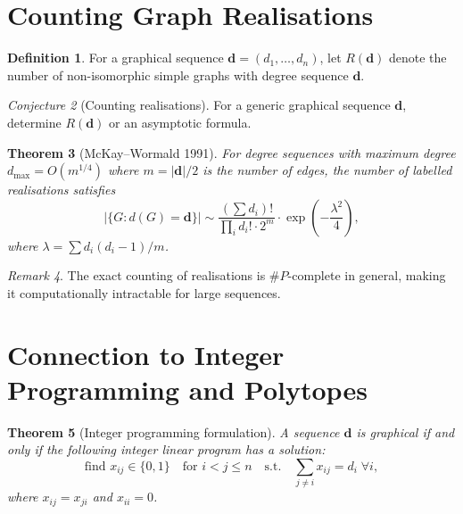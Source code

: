 \documentclass[12pt,a4paper]{amsart}
\newtheorem{theorem}{Theorem}[section]
\theoremstyle{definition}
\newtheorem{definition}[theorem]{Definition}
\theoremstyle{remark}
\newtheorem{remark}[theorem]{Remark}
\newtheorem{conjecture}[theorem]{Conjecture}
\begin{document}
\section{Counting Graph Realisations}

\begin{definition}
For a graphical sequence $\mathbf{d} = (d_1, \ldots, d_n)$, let
$R(\mathbf{d})$ denote the number of non-isomorphic simple graphs with
degree sequence $\mathbf{d}$.
\end{definition}

\begin{conjecture}[Counting realisations]
\label{conj:count}
For a generic graphical sequence $\mathbf{d}$, determine $R(\mathbf{d})$
or an asymptotic formula.
\end{conjecture}

\begin{theorem}[McKay--Wormald 1991]
For degree sequences with maximum degree $d_{\max} = O(m^{1/4})$ where
$m = |\mathbf{d}|/2$ is the number of edges, the number of labelled
realisations satisfies
\[
  |\{G : d(G) = \mathbf{d}\}| \sim \frac{(\sum d_i)!}{\prod_i d_i! \cdot 2^m}
  \cdot \exp\left(-\frac{\lambda^2}{4}\right),
\]
where $\lambda = \sum d_i(d_i-1)/m$.
\end{theorem}

\begin{remark}
The exact counting of realisations is $\#P$-complete in general, making it
computationally intractable for large sequences.
\end{remark}

\section{Connection to Integer Programming and Polytopes}

\begin{theorem}[Integer programming formulation]
A sequence $\mathbf{d}$ is graphical if and only if the following integer
linear program has a solution:
\[
  \text{find } x_{ij} \in \{0,1\} \quad \text{for } i < j \leq n
  \quad \text{s.t.} \quad \sum_{j \neq i} x_{ij} = d_i \; \forall i,
\]
where $x_{ij} = x_{ji}$ and $x_{ii} = 0$.
\end{theorem}
\end{document}
